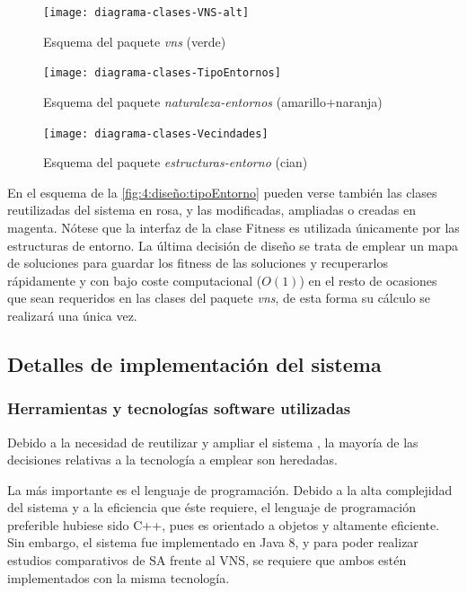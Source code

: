 \begin{figure}[htbp]
	\centering
	\texttt{[image: diagrama-clases-VNS-alt]}
	\caption{Esquema del paquete \textit{vns} (verde)}
	\label{fig:4:diseño:vns}
\end{figure}

\begin{figure}[htbp]
	\centering
	\texttt{[image: diagrama-clases-TipoEntornos]}
	\caption{Esquema del paquete \textit{naturaleza-entornos} (amarillo+naranja)}
	\label{fig:4:diseño:tipoEntorno}
\end{figure}

\begin{figure}[htbp]
	\centering
	\texttt{[image: diagrama-clases-Vecindades]}
	\caption{Esquema del paquete \textit{estructuras-entorno} (cian)}
	\label{fig:4:diseño:entornos}
\end{figure}

En el esquema de la \autoref{fig:4:diseño:tipoEntorno} pueden verse también las clases reutilizadas del sistema \legacy{} en rosa, y las modificadas, ampliadas o creadas en magenta. Nótese que la interfaz de la clase Fitness es utilizada únicamente por las estructuras de entorno. La última decisión de diseño se trata de emplear un mapa de soluciones para guardar los fitness de las soluciones y recuperarlos rápidamente y con bajo coste computacional ($O(1)$) en el resto de ocasiones que sean requeridos en las clases del paquete \textit{vns}, de esta forma su cálculo se realizará una única vez.





\subsection{Detalles de implementación del sistema}
\label{sec:4:implementacion}

\subsubsection{Herramientas y tecnologías software utilizadas}

Debido a la necesidad de reutilizar y ampliar el sistema \legacy{}, la mayoría de las decisiones relativas a la tecnología a emplear son heredadas. 

La más importante es el lenguaje de programación. Debido a la alta complejidad del sistema y a la eficiencia que éste requiere, el lenguaje de programación preferible hubiese sido C++, pues es orientado a objetos y altamente eficiente. Sin embargo, el sistema \legacy{} fue implementado en Java 8, y para poder realizar estudios comparativos de SA frente al VNS, se requiere que ambos estén implementados con la misma tecnología.

